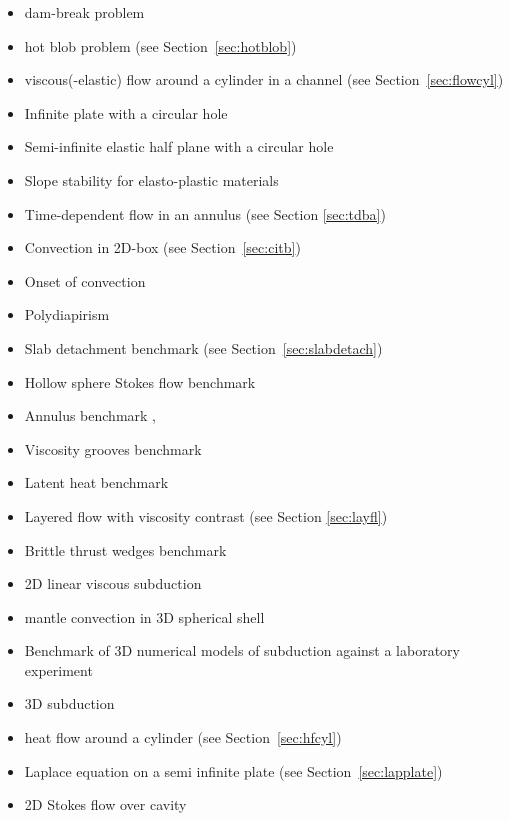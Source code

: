 \begin{itemize}
\item dam-break problem \cite{moeb99,bacp07,liir07,lemx08,homa09,anco09,grdn97,hini81,basd08}
\item hot blob problem \cite{bugs09,fumt11} (see Section~\ref{sec:hotblob})
\item viscous(-elastic) flow around a cylinder in a channel (see Section~\ref{sec:flowcyl})
\item Infinite plate with a circular hole \cite{yiha10,rama16}
\item Semi-infinite elastic half plane with a circular hole \cite{verr98}
\item Slope stability for elasto-plastic materials \cite{rama16}
\item Time-dependent flow in an annulus \cite{galb19} (see Section \ref{sec:tdba})
\item Convection in 2D-box \cite{galb19} (see Section~\ref{sec:citb})
\item Onset of convection \cite{aspectmanual}
\item Polydiapirism \cite{wesc92,aspectmanual}
\item Slab detachment benchmark (see Section~\ref{sec:slabdetach}) 
\item Hollow sphere Stokes flow benchmark \cite{thie17,homb20}
\item Annulus benchmark \cite{aspectmanual}, \cite{ples11}
\item Viscosity grooves benchmark \cite{aspectmanual}
\item Latent heat benchmark \cite{aspectmanual}
\item Layered flow with viscosity contrast \cite{aspectmanual} (see Section \ref{sec:layfl}) 
\item Brittle thrust wedges benchmark \cite{busa16,aspectmanual}
\item 2D linear viscous subduction \cite{scbe08,gltf18}
\item mantle convection in 3D spherical shell \cite{rasz96,iwas96,zhzm00,yoka04,sthh06,chcc07,zhmt08,kaks08,wrfy10,dadb13,arfw14,liki19}
\item Benchmark of 3D numerical models of subduction against a laboratory experiment \cite{memm18}
\item 3D subduction \cite{ozrs08}
\item heat flow around a cylinder (see Section~\ref{sec:hfcyl})
\item Laplace equation on a semi infinite plate (see Section~\ref{sec:lapplate})
\item 2D Stokes flow over cavity \cite{poma14}

\end{itemize}
